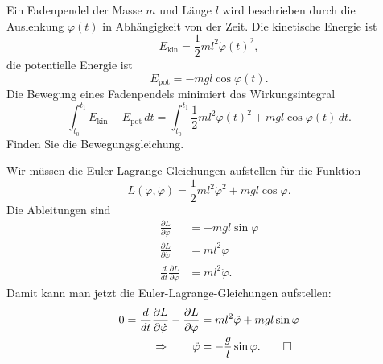 Ein Fadenpendel der Masse $m$ und Länge $l$ wird beschrieben durch
die Auslenkung $\varphi(t)$ in Abhängigkeit von der Zeit. 
Die kinetische Energie ist 
\[
E_{\text{kin}}
=
\frac12ml^2\dot\varphi(t)^2,
\]
die potentielle Energie ist
\[
E_{\text{pot}}
=
-mgl\cos\varphi(t).
\]
Die Bewegung eines Fadenpendels minimiert das Wirkungsintegral
\[
\int_{t_0}^{t_1}
E_{\text{kin}}-E_{\text{pot}}
\,dt
=
\int_{t_0}^{t_1}
\frac12ml^2\dot\varphi(t)^2
+
mgl\cos\varphi(t)
\,dt.
\]
Finden Sie die Bewegungsgleichung.

\begin{loesung}
Wir müssen die Euler-Lagrange-Gleichungen aufstellen für die
Funktion
\[
L(\varphi, \dot\varphi)
=
\frac12ml^2\dot\varphi^2
+
mgl\cos\varphi.
\]
Die Ableitungen sind
\begin{align*}
\frac{\partial L}{\partial\varphi}
&=
-mgl\sin\varphi
\\
\frac{\partial L}{\partial\dot\varphi}
&=
ml^2\dot\varphi
\\
\frac{d}{dt}
\frac{\partial L}{\partial\dot\varphi}
&=
ml^2\ddot\varphi.
\end{align*}
Damit kann man jetzt die Euler-Lagrange-Gleichungen aufstellen:
\begin{align*}
0=
\frac{d}{dt}
\frac{\partial L}{\partial\dot\varphi}
-
\frac{\partial L}{\partial\varphi}
&=
ml^2\ddot\varphi
+
mgl\sin\varphi
\\
\Rightarrow\qquad
\ddot\varphi
&=
-\frac{g}{l}\sin\varphi.
\qedhere
\end{align*}
\end{loesung}


